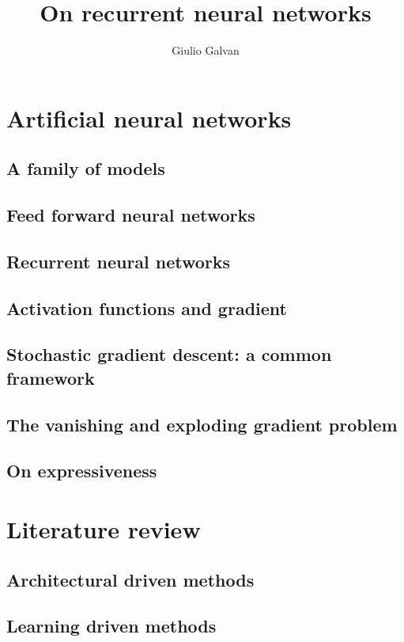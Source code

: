 \documentclass{book}
\title{On recurrent neural networks}
\author{Giulio Galvan}
\theoremstyle{definition}
\theoremstyle{definition}
\theoremstyle{definition}
\begin{document}
\maketitle
\tableofcontents
\chapter{Artificial neural networks}
  \section{A family of models}
  
  \section{Feed forward neural networks}
  
  \section{Recurrent neural networks}
  
  \section{Activation functions and gradient}
  
  \section{Stochastic gradient descent: a common framework}
  
  \section{The vanishing and exploding gradient problem}
    \label{sec:vanishing}
    
  \section{On expressiveness}
  \label{sec:expressiveness}
  
\chapter{Literature review}
  
  \section{Architectural driven methods}
  
  
  
  
  \section{Learning driven methods}
  
  
  
  
  
\end{document}
